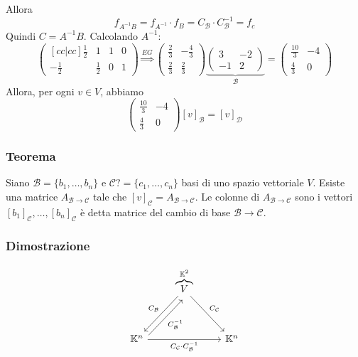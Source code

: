\documentclass[12pt]{article}
\begin{document}
Allora
\[f_{A^{-1}B} = f_{A^{-1}} \cdot f_B = C_{\mathcal{B}} \cdot C_{\mathcal{B}}^{-1} = f_c\]
Quindi $C = A^{-1}B$.
Calcolando $A^{-1}$:
\[\begin{pmatrix}[cc|cc]
    \frac{1}{2} & 1 & 1 & 0\\
    -\frac{1}{2} & \frac{1}{2} & 0 & 1
\end{pmatrix} \stackrel{EG}{\Longrightarrow} \begin{pmatrix}
    \frac{2}{3} & -\frac{4}{3}\\
    \frac{2}{3} & \frac{2}{3}
\end{pmatrix}\underbrace{\begin{pmatrix}
    3 & -2\\
    -1 & 2
\end{pmatrix}}_{\mathcal{B}} = \begin{pmatrix}
    \frac{10}{3} & -4\\
    \frac{4}{3} & 0
\end{pmatrix}\]
Allora, per ogni $v \in V$, abbiamo
\[\begin{pmatrix}
    \frac{10}{3} & -4\\
    \frac{4}{3} & 0
\end{pmatrix}[v]_{\mathcal{B}} = [v]_{\mathcal{D}}\]

\subsubsection{Teorema}
Siano $\mathcal{B} = \{b_1, \dots, b_n\}$ e $\mathcal{C} ?= \{c_1, \dots, c_n\}$ basi di uno spazio vettoriale $V$. Esiste una matrice $A_{\mathcal{B} \rightarrow \mathcal{C}}$ tale che $[v]_{\mathcal{C}} = A_{\mathcal{B} \rightarrow \mathcal{C}}$. Le colonne di $A_{\mathcal{B} \rightarrow \mathcal{C}}$ sono i vettori $[b_1]_{\mathcal{C}}, \dots, [b_n]_{\mathcal{C}}$ è detta matrice del cambio di base $\mathcal{B} \rightarrow \mathcal{C}$.

\subsubsection{Dimostrazione}

\begin{equation*}
\begin{tikzcd}[row sep=huge]
 &
\overbrace{V}^{\mathbb{K}^2} \arrow[dl,swap, "C_{\mathcal{B}}"] \arrow[dr,"C_{\mathcal{C}}"] &
\\
\mathbb{K}^n  \arrow[rr, swap, "C_{\mathcal{C}} \cdot C_{\mathcal{B}}^{-1}"] \arrow[ur, swap, shift right=0.2cm, "C_{\mathcal{B}}^{-1}"]& & \mathbb{K}^n
\end{tikzcd}
\end{equation*}
\end{document}
